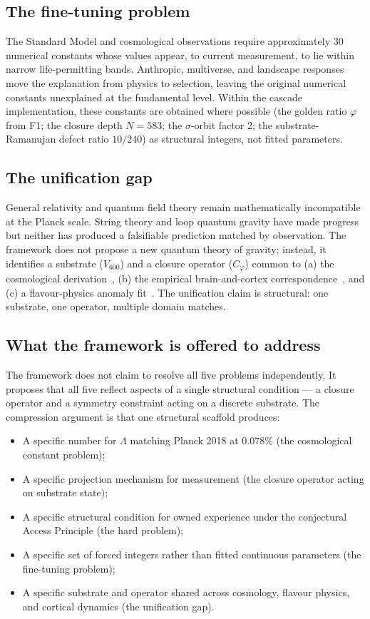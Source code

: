 \documentclass[11pt]{article}
\theoremstyle{plain}
\theoremstyle{definition}
\theoremstyle{remark}
\newcommand{\Cph}{C_\varphi}
\begin{document}
\subsection{The fine-tuning problem}

The Standard Model and cosmological observations require approximately 30 numerical constants whose values appear, to current measurement, to lie within narrow life-permitting bands. Anthropic, multiverse, and landscape responses move the explanation from physics to selection, leaving the original numerical constants unexplained at the fundamental level. Within the cascade implementation, these constants are obtained where possible (the golden ratio $\varphi$ from F1; the closure depth $N = 583$; the $\sigma$-orbit factor 2; the substrate-Ramanujan defect ratio $10/240$) as structural integers, not fitted parameters.

\subsection{The unification gap}

General relativity and quantum field theory remain mathematically incompatible at the Planck scale. String theory and loop quantum gravity have made progress but neither has produced a falsifiable prediction matched by observation. The framework does not propose a new quantum theory of gravity; instead, it identifies a substrate ($V_{600}$) and a closure operator ($\Cph$) common to (a) the cosmological derivation~\citep{SmartHypersphereCosmology}, (b) the empirical brain-and-cortex correspondence~\citep{SmartAriaChess2026}, and (c) a flavour-physics anomaly fit~\citep{SmartAriaClosureKernel}. The unification claim is structural: one substrate, one operator, multiple domain matches.

\subsection{What the framework is offered to address}

The framework does not claim to resolve all five problems independently. It proposes that all five reflect aspects of a single structural condition --- a closure operator and a symmetry constraint acting on a discrete substrate. The compression argument is that one structural scaffold produces:

\begin{itemize}[leftmargin=2em]
\item A specific number for $\Lambda$ matching Planck 2018 at $0.078\%$ (the cosmological constant problem);
\item A specific projection mechanism for measurement (the closure operator acting on substrate state);
\item A specific structural condition for owned experience under the conjectural Access Principle (the hard problem);
\item A specific set of forced integers rather than fitted continuous parameters (the fine-tuning problem);
\item A specific substrate and operator shared across cosmology, flavour physics, and cortical dynamics (the unification gap).
\end{itemize}
\end{document}
